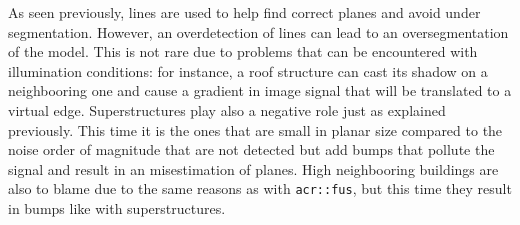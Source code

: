                 \begin{figure}[htb]
                    \centering
                \end{figure}

                As seen previously, lines are used to help find correct planes and avoid under segmentation.
                However, an overdetection of lines can lead to an oversegmentation of the model.
                This is not rare due to problems that can be encountered with illumination conditions: for instance, a roof structure can cast its shadow on a neighbooring one and cause a gradient in image signal that will be translated to a virtual edge.
                Superstructures play also a negative role just as explained previously.
                This time it is the ones that are small in planar size compared to the noise order of magnitude that are not detected but add bumps that pollute the signal and result in an misestimation of planes.
                High neighbooring buildings are also to blame due to the same reasons as with \texttt{\gls{acr::fus}}, but this time they result in bumps like with superstructures.\\

